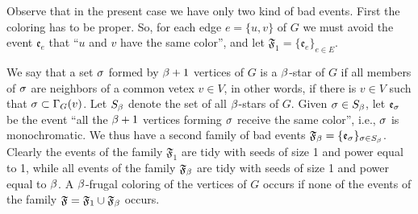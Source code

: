 \documentclass[11pt]{article}
\let\\=\noindent
\let\\=\noindent
\def\ev{{\mathfrak{e}}}
\def\FF{{\mathfrak{F}}}
\begin{document}
\\Observe that in the present case we have only two kind of bad events. First the coloring has to be proper. So,  for each edge $e=\{u,v\}$ of $G$ we must avoid the event $\ev_e$ that  ``$u$ and $v$ have the same color'', and let $\FF_1=\{\ev_e\}_{e \in E}$.

\\We say that a set $\sigma$ formed by  $\beta+1$ vertices of $G$ is a $\beta$-star  of $G$ if all members of $\sigma$ are
 neighbors of a common vetex $v\in V$, in other words, if there is $v\in V$ such that
$\sigma\subset \Gamma_G(v)$. Let $S_\beta$ denote the set of all  $\beta$-stars of $G$.
Given $\sigma\in S_\beta$, let $\ev_\s$ be the event ``all the $\beta+1$ vertices forming  $\sigma$ receive the same color'', i.e., $\sigma$ is monochromatic. We thus have a second family of bad events $\FF_\b= \{\ev_\s\}_{\s\in S_\b}$. Clearly the events of the family $\FF_1$ are tidy with seeds
of size 1 and power equal to 1, while all events of the family $\FF_\b$ are tidy with seeds of size 1 and power equal to $\beta$. A $\beta$-frugal coloring of the vertices of $G$ occurs if none of the events of the family $\FF=\FF_1\cup \FF_\b$ occurs.

%
\end{document}
